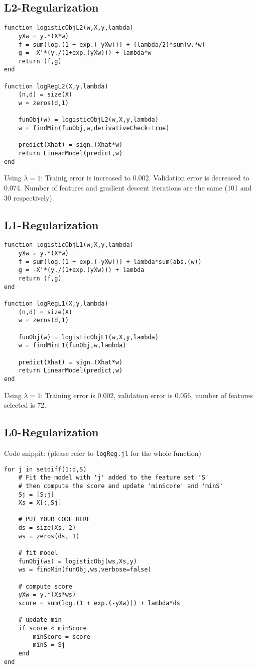 \documentclass{article}
\begin{document}
\subsection{L2-Regularization}

\begin{verbatim}
function logisticObjL2(w,X,y,lambda)
    yXw = y.*(X*w)
    f = sum(log.(1 + exp.(-yXw))) + (lambda/2)*sum(w.*w)
    g = -X'*(y./(1+exp.(yXw))) + lambda*w
    return (f,g)
end

function logRegL2(X,y,lambda)
    (n,d) = size(X)
    w = zeros(d,1)

    funObj(w) = logisticObjL2(w,X,y,lambda)
    w = findMin(funObj,w,derivativeCheck=true)

    predict(Xhat) = sign.(Xhat*w)
    return LinearModel(predict,w)
end
\end{verbatim}
Using $\lambda = 1$:
Trainig error is increased to 0.002.
Validation error is decreased to 0.074.
Number of features and gradient descent iterations are the same (101 and 30 respectively).

\subsection{L1-Regularization}

\begin{verbatim}
function logisticObjL1(w,X,y,lambda)
    yXw = y.*(X*w)
    f = sum(log.(1 + exp.(-yXw))) + lambda*sum(abs.(w))
    g = -X'*(y./(1+exp.(yXw))) + lambda
    return (f,g)
end

function logRegL1(X,y,lambda)
    (n,d) = size(X)
    w = zeros(d,1)

    funObj(w) = logisticObjL1(w,X,y,lambda)
    w = findMinL1(funObj,w,lambda)

    predict(Xhat) = sign.(Xhat*w)
    return LinearModel(predict,w)
end
\end{verbatim}
 Using $\lambda = 1$: Training error is 0.002, validation error is 0.056, number of features selected is 72.


\subsection{L0-Regularization}

Code snippit: (please refer to \texttt{logReg.jl} for the whole function)
\begin{verbatim}
for j in setdiff(1:d,S)
    # Fit the model with 'j' added to the feature set 'S'
    # then compute the score and update 'minScore' and 'minS'
    Sj = [S;j]
    Xs = X[:,Sj]

    # PUT YOUR CODE HERE
    ds = size(Xs, 2)
    ws = zeros(ds, 1)

    # fit model
    funObj(ws) = logisticObj(ws,Xs,y)
    ws = findMin(funObj,ws,verbose=false)

    # compute score
    yXw = y.*(Xs*ws)
    score = sum(log.(1 + exp.(-yXw))) + lambda*ds

    # update min
    if score < minScore
        minScore = score
        minS = Sj
    end
end
\end{verbatim}
\end{document}
